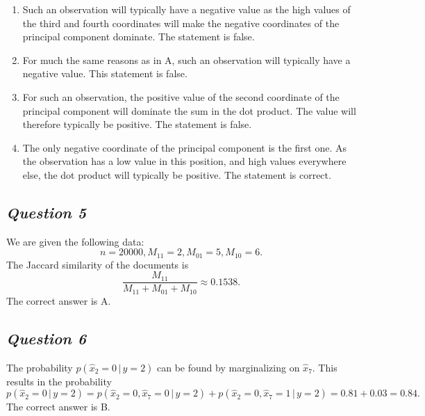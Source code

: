 \documentclass[twoside,11pt]{article}
\makeatletter
\let\@oldsubsection\subsection
\renewcommand\subsection[1]{\@oldsubsection*{\textit{#1}}}
\makeatother
\begin{document}
\begin{enumerate}[label=\Alph*.]
	\item Such an observation will typically have a negative value as the high values of the third and fourth coordinates will make the negative coordinates of the principal component dominate. The statement is false.

	\item For much the same reasons as in A, such an observation will typically have a negative value. This statement is false.

	\item For such an observation, the positive value of the second coordinate of the principal component will dominate the sum in the dot product. The value will therefore typically be positive. The statement is false.

	\item The only negative coordinate of the principal component is the first one. As the observation has a low value in this position, and high values everywhere else, the dot product will typically be positive. The statement is correct.
	\end{enumerate}

\subsection{Question 5}

We are given the following data:
\[
	n = 20000, M_{11} = 2, M_{01} = 5, M_{10} = 6.
\]
The Jaccard similarity of the documents is
\[
	\frac{M_{11}}{M_{11} + M_{01} + M_{10}} \approx 0.1538.
\]
The correct answer is A.

\subsection{Question 6}

The probability \(p(\hat{x}_2 = 0 \, | \, y = 2)\) can be found by marginalizing on \(\hat{x}_7\). This results in the probability
\[
	p(\hat{x}_2 = 0 \, | \, y = 2) = p(\hat{x}_2 = 0, \hat{x}_7 = 0 \, | \, y = 2)
	+ p(\hat{x}_2 = 0, \hat{x}_7 = 1 \, | \, y = 2) = 0.81 + 0.03 = 0.84.
\]
The correct answer is B.


\end{document}
